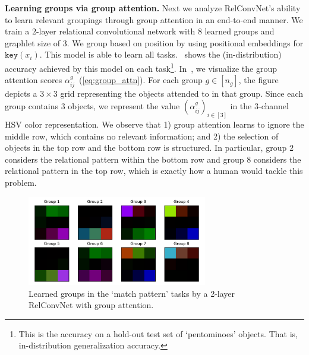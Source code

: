 \textbf{Learning groups via group attention.} Next we analyze RelConvNet's ability to learn relevant groupings through group attention in an end-to-end manner. We train a $2$-layer relational convolutional network with $8$ learned groups and graphlet size of $3$. We group based on position by using positional embeddings for $\mathtt{key}(x_i)$. This model is able to learn all tasks.~ shows the (in-distribution) accuracy achieved by this model on each task\footnote{This is the accuracy on a hold-out test set of `pentominoes' objects. That is, in-distribution generalization accuracy.}. In~, we visualize the group attention scores $\alpha_{ij}^g$~(\cref{eq:group_attn}). For each group $g \in [n_g]$, the figure depicts a $3 \times 3$ grid representing the objects attended to in that group. Since each group contains $3$ objects, we represent the value $(\alpha_{ij}^g)_{i \in [3]}$ in the $3$-channel HSV color representation. We observe that 1) group attention learns to ignore the middle row, which contains no relevant information; and 2) the selection of objects in the top row and the bottom row is structured. In particular, group $2$ considers the relational pattern within the bottom row and group $8$ considers the relational pattern in the top row, which is exactly how a human would tackle this problem.

\begin{figure}
    \centering
    \includegraphics[width=0.7\textwidth]{figs/group_attn_figs/match_patt_group_attn_map.pdf}
    \caption{Learned groups in the `match pattern' tasks by a 2-layer RelConvNet with group attention.}\label{fig:matchpatt_groupattn}
\end{figure}
